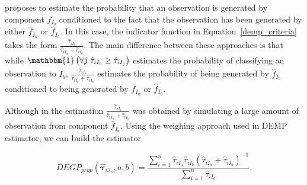 \documentclass[10pt, a4paper]{article}
\newcommand{\m}[1]{\boldsymbol{#1}}
\begin{document}
\cite{longford2014} proposes to estimate the probability that an observation is generated by component $\hat{f}_{I_b}$ conditioned to the fact that the observation has been generated by either $\hat{f}_{I_a}$ or $\hat{f}_{I_b}$. In this case, the indicator function in Equation~\ref{demp_criteria} takes the form $\frac{\hat{\tau}_{iI_b}}{\hat{\tau}_{iI_a} + \hat{\tau}_{iI_b}}$. The main difference between these approaches is that while $\mathbbm{1}\left( \forall j\; \hat{\tau}_{i I_{b}} \geq \hat{\tau}_{iI_j} \right)$ estimates the probability of classifying an observation to $I_b$, $\frac{\hat{\tau}_{iI_b}}{\hat{\tau}_{iI_a} + \hat{\tau}_{iI_b}}$ estimates the probability of being generated by $\hat{f}_{I_b}$ conditioned to being generated by $\hat{f}_{I_a}$ or $\hat{f}_{I_b}$.

Although in  \cite{longford2014} the estimation $\frac{\hat{\tau}_{iI_b}}{\hat{\tau}_{iI_a} + \hat{\tau}_{iI_b}}$ was obtained by simulating a large amount of observation from component $\hat{f}_{I_a}$. Using the weighing approach used in DEMP estimator, we can build the estimator

\begin{equation}\label{demp2_criteria}
DEGP_{prop}(\hat{\m \tau}_{i \mathcal{I}_s}, a, b) =\frac{ \sum_{i=1}^n \hat{\tau}_{iI_a} \hat{\tau}_{iI_b}(\hat{\tau}_{iI_a} + \hat{\tau}_{iI_b})^{-1}  }{\sum_{i=1}^n \hat{\tau}_{iI_a} }.
\end{equation}





%
%
%
%
%
\end{document}
